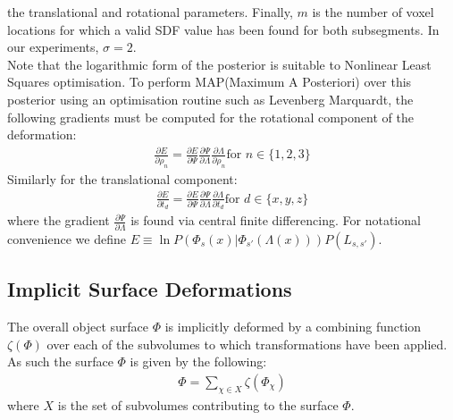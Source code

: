 the translational and rotational parameters. Finally, $m$ is the number of voxel locations for which a valid SDF value has been found for both subsegments. In our experiments, $\sigma = 2$.\\
Note that the logarithmic form of the posterior is suitable to Nonlinear Least Squares optimisation. To perform MAP(Maximum A Posteriori) over this posterior using 
an optimisation routine such as Levenberg Marquardt, the following gradients must be computed for the rotational component of the 
deformation:
\begin{equation}
\begin{split}
\frac{\partial E}{\partial \rho_{n}} = \frac{\partial E}{\partial \Psi} \frac{\partial \Psi}{\partial \Lambda} \frac{\partial \Lambda}{\partial \rho_{n}} \text{for } n \in \{1,2,3\}
\end{split}
\end{equation}
Similarly for the translational component:
\begin{equation}
\begin{split}
\frac{\partial E}{\partial t_{d}} = \frac{\partial E}{\partial \Psi} \frac{\partial \Psi}{\partial \Lambda} \frac{\partial \Lambda}{\partial t_{d}} \text{for } d \in  \{x,y,z\}
\end{split}
\end{equation}
where the gradient $\frac{\partial \Psi}{\partial \Lambda}$ is found via central finite differencing.
For notational convenience we define $E \equiv \ln P(\Phi_{s}(x) | \Phi_{s'}(\Lambda(x)))P(L_{s, s'})$.

\subsection{Implicit Surface Deformations}
The overall object surface $\Phi$ is implicitly deformed by a combining function $\zeta(\Phi)$ over each of the subvolumes to which transformations have been applied.
As such the surface $\Phi$ is given by the following:
\begin{equation}
\begin{split}
\Phi = \sum_{\chi \in X} \zeta(\Phi_{\chi})
\end{split}
\end{equation}
where $X$ is the set of subvolumes contributing to the surface $\Phi$.

